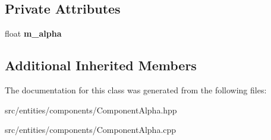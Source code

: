 \subsection*{Private Attributes}
\begin{DoxyCompactItemize}
\item 
\mbox{\label{class_flounder_1_1_component_alpha_ae5bb9dded5c69c76bf500c9c3b75e919}} 
float {\bfseries m\+\_\+alpha}
\end{DoxyCompactItemize}
\subsection*{Additional Inherited Members}


The documentation for this class was generated from the following files\+:\begin{DoxyCompactItemize}
\item 
src/entities/components/Component\+Alpha.\+hpp\item 
src/entities/components/Component\+Alpha.\+cpp\end{DoxyCompactItemize}
